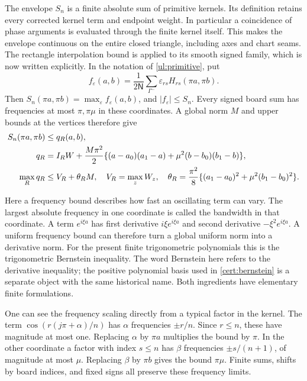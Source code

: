 The envelope $S_n$ is a finite absolute sum of primitive kernels.
Its definition retains every corrected kernel term and endpoint
weight. In particular a coincidence of phase arguments is evaluated
through the finite kernel itself. This makes the envelope continuous
on the entire closed triangle, including axes and chart seams. The
rectangle interpolation bound is applied to its smooth signed family,
which is now written explicitly.
In the notation of \eqref{ul:primitive}, put
\[
 f_\varepsilon(a,b)=\frac1{2\mathsf N}
       \sum_{\Gamma^-}\varepsilon_{rs}H_{rs}(\pi a,\pi b).
\]
Then $S_n(\pi a,\pi b)=\max_\varepsilon f_\varepsilon(a,b)$,
and $|f_\varepsilon|\leq S_n$. Every signed board sum has frequencies
at most $\pi,\pi \mu$ in these coordinates. A global norm $M$
and upper bounds at the vertices therefore give
\begin{align}\label{cert:phase-bound}
 S_n(\pi a,\pi b)&\leq q_R(a,b),\\
 q_R&=I_RW+\frac{M\pi^2}{2}
 \{(a-a_0)(a_1-a)+\mu^2(b-b_0)(b_1-b)\},\notag\\
 \max_Rq_R&\leq V_R+\theta_RM,
 \quad V_R=\max_zW_z,\quad
 \theta_R=\frac{\pi^2}{8}\{(a_1-a_0)^2+\mu^2(b_1-b_0)^2\}.\notag
\end{align}

Here a frequency bound describes how fast an oscillating term can
vary. The largest absolute frequency in one coordinate is called the
bandwidth in that coordinate. A term $e^{i\xi a}$ has first derivative $i\xi e^{i\xi a}$
and second derivative $-\xi^2e^{i\xi a}$. A uniform frequency bound
can therefore turn a global uniform norm into a derivative norm.
For the present finite trigonometric polynomials this is the
trigonometric Bernstein inequality. The word Bernstein here refers
to the derivative inequality; the positive polynomial basis used in
\eqref{cert:bernstein} is a separate object with the same historical
name. Both ingredients have elementary finite formulations.

One can see the frequency scaling directly from a typical factor in
the kernel. The term
$\cos(r(j\pi+\alpha)/n)$ has $\alpha$ frequencies $\pm r/n$.
Since $r\leq n$, these have magnitude at most one. Replacing
$\alpha$ by $\pi a$ multiplies the bound by $\pi$. In the other
coordinate a factor with index $s\leq n$ has $\beta$ frequencies
$\pm s/(n+1)$, of magnitude at most $\mu$. Replacing $\beta$ by
$\pi b$ gives the bound $\pi \mu$. Finite sums, shifts by board
indices, and fixed signs all preserve these frequency limits.

